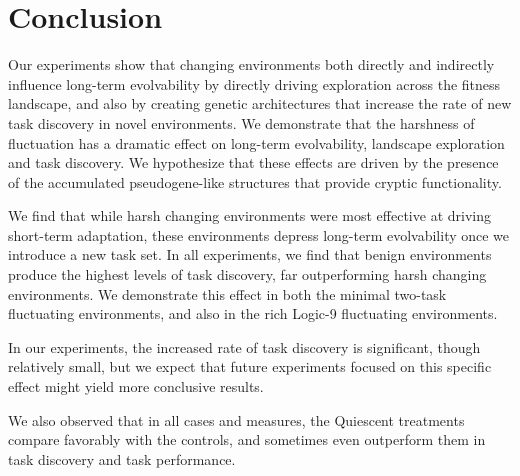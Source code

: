 \documentclass[PhD]{msu-thesis}
\begin{document}
\section{Conclusion}
 
Our experiments show that changing environments both directly and indirectly influence long-term evolvability by directly driving exploration across the fitness landscape, and also by creating genetic architectures that increase the rate of new task discovery in novel environments.
We demonstrate that the harshness of fluctuation has a dramatic effect on long-term evolvability, landscape exploration and task discovery. 
We hypothesize that these effects are driven by the presence of the accumulated pseudogene-like structures that provide cryptic functionality.

We find that while harsh changing environments were most effective at driving short-term adaptation, these environments depress long-term evolvability once we introduce a new task set. 
In all experiments, we find that benign environments produce the highest levels of task discovery, far outperforming harsh changing environments. 
We demonstrate this effect in both the minimal two-task fluctuating environments, and also in the rich Logic-9 fluctuating environments. 


In our experiments, the increased rate of task discovery is significant, though relatively small, but we expect that future experiments focused on this specific effect might yield more conclusive results.

We also observed that in all cases and measures, the Quiescent treatments compare favorably with the controls, and sometimes even outperform them in task discovery and task performance.  


 
\end{document}
